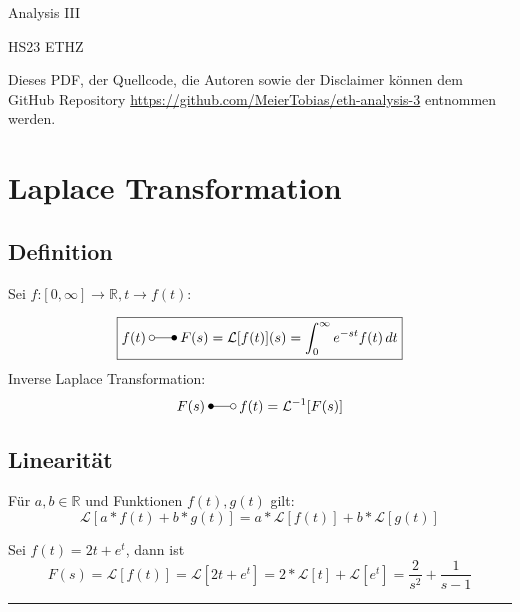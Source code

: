 \documentclass[a4paper,10pt,landscape]{scrartcl}
\begin{document}
\begin{multicols*}{3}
%
\begin{center}
    \huge{Analysis III \par}
    \vspace{0.1cm}
    \large{HS23 ETHZ\par}
    \vspace{0.3cm}
\end{center}
Dieses PDF, der Quellcode, die Autoren sowie der Disclaimer können dem GitHub Repository \url{https://github.com/MeierTobias/eth-analysis-3} entnommen werden.
\vspace{0.2cm}
%
\section{Laplace Transformation}
\subsection{Definition}
Sei $f$:$[0,\infty] \rightarrow \mathbb{R}, t \rightarrow f(t)$:

\begin{equation*}
    \boxed{
    f(t)\:\laplace\:F(s)=\mathcal{L}[f(t)](s)=\int_{0}^{\infty}e^{-st}f(t)\,dt 
    }
\end{equation*}
Inverse Laplace Transformation:
\begin{equation*}
    F(s)\:\Laplace\:f(t)=\mathcal{L}^{-1}[F(s)]
\end{equation*}

\subsection{Linearität}
Für $a,b \in \mathbb{R}$ und Funktionen $f(t),g(t)$ gilt:
\begin{equation*}
    \mathcal{L}[a*f(t)+b*g(t)] = a*\mathcal{L}[f(t)]+b*\mathcal{L}[g(t)]
\end{equation*}

\begin{examplesection}[Beispiele]
    Sei $f(t)=2t+e^t$, dann ist
    \begin{equation*}
        F(s)=\mathcal{L}[f(t)]=\mathcal{L}[2t+e^t]=2*\mathcal{L}[t] + \mathcal{L}[e^t]=\frac{2}{s^2}+\frac{1}{s-1}
    \end{equation*}
    \hrule{}
\end{examplesection}


\vfill\null %
\columnbreak
%

%  
\end{multicols*}
%
\end{document}
